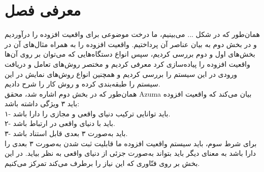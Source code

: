 \section{معرفی فصل}
همان‌طور که در شکل ... می‌بینیم، ما درخت موضوعی برای واقعیت افزوده را درآوردیم و در بخش دوم به بیان عناصر آن پرداختیم.
واقعیت افزوده را به همراه مثال‌های آن در بخش‌های اول و دوم بررسی کردیم، سپس انواع دستگاه‌هایی که می‌توان بر روی آن‌ها واقعیت افزوده را پیاده‌سازی کرد معرفی کردیم و مختصر روش‌های تعامل و دریافت ورودی در این سیستم را بررسی کردیم و همچنین انواع روش‌های نمایش در این سیستم را طبقه‌بندی کرده و روش کار را شرح دادیم.
\\
همان‌طور که در بخش دوم اشاره شد، محقق Azuma بیان می‌کند که واقعیت افزوده باید ۳ ویژگی داشته باشد\cite{Azuma}:
\\
۱- باید توانایی ترکیب دنیای واقعی و مجازی را دارا باشد.
\\
۲- باید با دنیای واقعی در ارتباط باشد.
\\
۳- باید به‌صورت ۳ بعدی قابل استناد باشد.
\\
برای شرط سوم، باید سیستم واقعیت افزوده ما قابلیت ثبت شدن به‌صورت ۳ بعدی را دارا باشد به معنای دیگر باید بتواند به‌صورت جزئی از دنیای واقعی به نظر بیاید. در این بخش ‌بر روی فنّاوری که این نیاز را برطرف می‌کند تمرکز می‌کنیم.
\\
